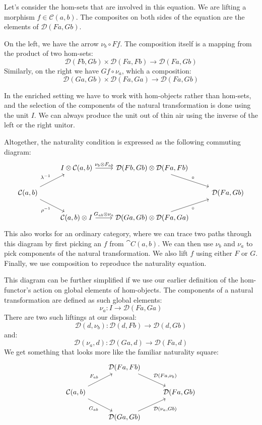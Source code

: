 \documentclass[DaoFP]{subfiles}
\begin{document}
Let's consider the hom-sets that are involved in this equation. We are lifting a morphism $f \in \mathcal C(a, b)$. The composites on both sides of the equation are the elements of $\mathcal D(F a, G b)$. 

On the left, we have the arrow $ \nu_b \circ F f$. The composition itself is a mapping from the product of two hom-sets:
\[  \mathcal D(F b, G b) \times \mathcal D(F a, F b) \to \mathcal D(F a, G b) \]
Similarly, on the right we have $G f \circ \nu_a$, which a composition:
\[ \mathcal D(G a, G b) \times \mathcal D(F a, G a) \to  \mathcal D(F a, G b) \]

In the enriched setting we have to work with hom-objects rather than hom-sets, and the selection of the components of the natural transformation is done using the unit $I$. We can always produce the unit out of thin air using the inverse of the left or the right unitor. 

Altogether, the naturality condition is expressed as the following commuting diagram:
\[
 \begin{tikzcd}
 & I \otimes \mathcal C(a, b)
 \arrow[r, "\nu_b \otimes F_{a b}"]
 & \mathcal D(F b, G b) \otimes \mathcal D(F a, F b)
 \arrow[dr, "\circ"]
 \\
 \mathcal C(a, b)
 \arrow[ur, "\lambda^{-1}"]
\arrow[dr, "\rho^{-1}"']
 &&& \mathcal D(F a, G b)
 \\
 & \mathcal C(a, b) \otimes I 
 \arrow[r, "G_{a b} \otimes \nu_a"]
 & \mathcal D(G a, G b) \otimes \mathcal D(F a, G a)
 \arrow[ur, "\circ"']
  \end{tikzcd}
\]
This also works for an ordinary category, where we can trace two paths through this diagram by first picking an $f$ from $\cat C(a, b)$. We can then use $\nu_b$ and $\nu_a$ to pick components of the natural transformation. We also lift $f$ using either $F$ or $G$. Finally, we use composition to reproduce the naturality equation.

This diagram can be further simplified if we use our earlier definition of  the hom-functor's action on global elements of hom-objects. The components of a natural transformation are defined as such global elements:
\[ \nu_a \colon I \to \mathcal D(F a, G a) \]
There are two such liftings at our disposal:
\[ \mathcal D(d, \nu_b) \colon \mathcal D(d, F b) \to \mathcal D(d, G b) \]
and:
\[ \mathcal D (\nu_a, d) \colon \mathcal D(G a, d) \to \mathcal D(F a, d) \]
We get something that looks more like the familiar naturality square:
\[
 \begin{tikzcd}
 & \mathcal D(F a, F b)
  \arrow[dr, "{\mathcal D (F a, \nu_b)}"]
 \\
 \mathcal C(a, b) 
 \arrow[ur, "F_{a b}"]
 \arrow[dr, "G_{a b}"']
 && \mathcal D(F a, G b)
 \\
& \mathcal D (G a, G b)
\arrow[ur, "{\mathcal D (\nu_a, G b)}"']
 \end{tikzcd}
\]
\end{document}
